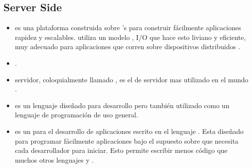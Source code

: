 \subsection{Server Side}
\begin{itemize}
	\item \textbf{\nodejs} es una plataforma construida sobre \chrome's \javascript \runtime para construir fácilmente aplicaciones \network rapidez y escalables. \nodejs utiliza un modelo \eventdriven, \nonbloking  I/O que hace esto liviano y eficiente, muy adecuado para aplicaciones \dataintensive \realtime que corren sobre dispositivos distribuidos \cite{technology_nodejs}.
	
	\item \textbf{\meteor}.
	
	\item \textbf{\apache} \http  servidor, coloquialmente llamado \apache, es el \software de servidor \web mas utilizado en el mundo \cite{online_technology_apache}.
	
	\item \textbf{\php} es un lenguaje \scripting \serverside diseñado para desarrollo \web pero también utilizado como un lenguaje de programación de uso general.
	
	\item \textbf{\rubyonrails} es un \framework para el desarrollo de aplicaciones \web escrito en el lenguaje \ruby. Esta diseñado para programar fácilmente aplicaciones \web bajo el supuesto sobre que necesita cada desarrollador para iniciar. Esto permite escribir menos código que muchos otros lenguajes y \frameworks \cite{online_technology_rubyonrails}.
	

\end{itemize}
